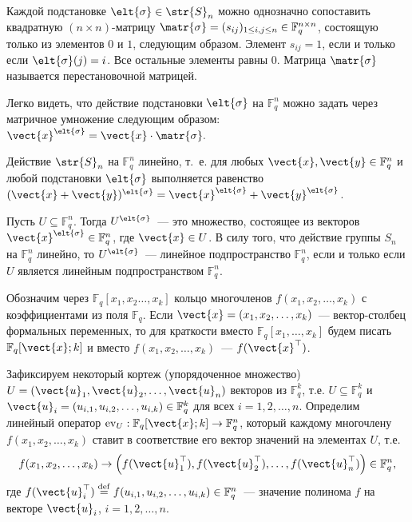 \documentclass{cmcmsuthesis-phd}
\begin{document}
Каждой подстановке \(\elt{\sigma}\in \str{S}_{n}\) можно однозначно сопоставить квадратную \((n\times n)\)-матрицу \(\matr{\sigma}=(s_{ij})_{1\le i,j\le n}\in \mathbb{F}^{n \times n}_{q}\), состоящую только из элементов \(0\) и \(1\), следующим образом.
Элемент \(s_{ij}=1\), если и только если \(\elt{\sigma}(j)=i\).
Все остальные элементы равны \(0\).
Матрица \(\matr{\sigma}\) называется перестановочной матрицей.

Легко видеть, что действие подстановки \(\elt{\sigma}\) на \(\mathbb{F}^n_q\) можно задать через матричное умножение следующим образом:
\(\vect{x}^{\elt{\sigma}}=\vect{x}\cdot \matr{\sigma}.\)

Действие \(\str{S}_{n}\) на \(\mathbb{F}^n_q\) линейно, т.~е. для любых \(\vect{x}, \vect{y}\in \mathbb{F}^n_q\) и любой подстановки \(\elt{\sigma}\) выполняется равенство \((\vect{x}+\vect{y})^{\elt{\sigma}}=\vect{x}^{\elt{\sigma}}+\vect{y}^{\elt{\sigma}}\).

Пусть \(U\subseteq \mathbb{F}^n_q\).
Тогда \(U^{\elt{\sigma}}\)~--- это множество, состоящее из векторов \(\vect{x}^{\elt{\sigma}}\in \mathbb{F}^n_q\), где \(\vect{x}\in U\).
В силу того, что действие группы \(S_n\) на \(\mathbb{F}^n_q\) линейно, то \(U^{\elt{\sigma}}\)~--- линейное подпространство \(\mathbb{F}^n_q\), если и только если \(U\) является линейным подпространством \(\mathbb{F}^n_q\).

Обозначим через \(\mathbb{F}_{q}[x_1,x_{2}\dotsc, x_{k}]\) кольцо многочленов \(f(x_1, x_2,\dotsc, x_{k})\) с коэффициентами из поля \(\mathbb{F}_{q}\).
Если \(\vect{x}=(x_1,x_2, \dotsc, x_{k})\)~--- вектор-столбец формальных переменных, то для краткости вместо \(\mathbb{F}_{q}[x_1,\dotsc, x_{k}]\) будем писать \(\mathbb{F}_{q}[\vect{x};k]\) и вместо \(f(x_1,x_2, \dotsc, x_k)\)~--- \(f(\vect{x}^{\top})\).

Зафиксируем некоторый кортеж (упорядоченное множество) \(U= \left(\vect{u}_1, \vect{u}_2, \dotsc, \vect{u}_{n}\right)\) векторов из \(\mathbb{F}^k_{q}\), т.е. \(U\subseteq \mathbb{F}^{k}_{q}\) и \(\vect{u}_i=(u_{i,1}, u_{i,2}, \dotsc, u_{i,k})\in \mathbb{F}^{k}_{q}\) для всех \(i=1,2, \dotsc, n\).
Определим линейный оператор \(\operatorname{ev}_{U}: \mathbb{F}_{q}[\vect{x};k] \rightarrow  \mathbb{F}^{n}_{q}\), который каждому многочлену \(f(x_1, x_2, \dotsc, x_{k})\) ставит в соответствие его вектор значений на элементах \(U\), т.е.
\[ f(x_1,x_2, \dotsc, x_k) \rightarrow \left(f(\vect{u}^{\top}_{1}), f(\vect{u}^{\top}_{2}), \dotsc, f(\vect{u}^{\top}_{n})\right)\in \mathbb{F}^{n}_{q}, \]
где \(f(\vect{u}^{\top}_i) \stackrel{\mathrm{def}}{=} f(u_{i,1}, u_{i,2}, \dotsc, u_{i,k})\in \mathbb{F}^{n}_{q}\)~--- значение полинома \(f\) на векторе \(\vect{u}_{i}\), \(i=1,2, \dotsc, n\).
\end{document}
